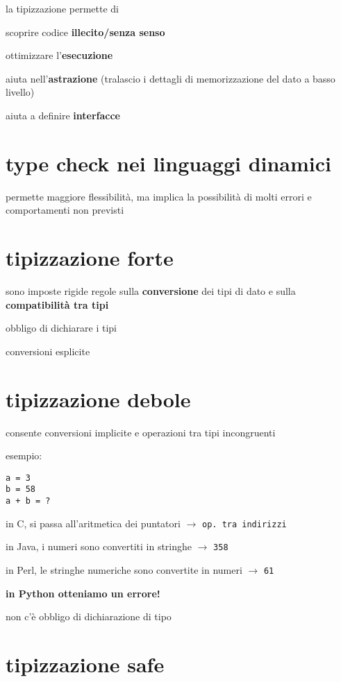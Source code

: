 la tipizzazione permette di

scoprire codice \textbf{illecito/senza senso}

ottimizzare l'\textbf{esecuzione}

aiuta nell'\textbf{astrazione} (tralascio i dettagli di memorizzazione del dato a basso livello)

aiuta a definire \textbf{interfacce}

\section{type check nei linguaggi dinamici}

permette maggiore flessibilit\`a, ma implica la possibilit\`a di molti errori e comportamenti non previsti

\section{tipizzazione forte}

sono imposte rigide regole sulla \textbf{conversione} dei tipi di dato e sulla \textbf{compatibilit\`a tra tipi}

obbligo di dichiarare i tipi

conversioni esplicite

\section{tipizzazione debole}

consente conversioni implicite e operazioni tra tipi incongruenti

esempio:

\begin{verbatim}
a = 3
b = 58
a + b = ?
\end{verbatim}

in C, si passa all'aritmetica dei puntatori $\rightarrow$ \texttt{op. tra indirizzi}

in Java, i numeri sono convertiti in stringhe $\rightarrow$ \texttt{358}

in Perl, le stringhe numeriche sono convertite in numeri $\rightarrow$ \texttt{61}

\textbf{in Python otteniamo un errore!}

non c'\`e obbligo di dichiarazione di tipo

\section{tipizzazione safe}

